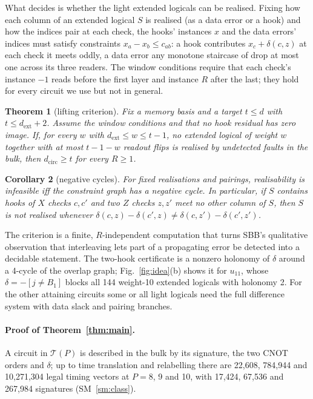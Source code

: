 \documentclass[aps,prl,twocolumn,superscriptaddress,nofootinbib]{revtex4-2}
\newcommand{\dcirc}{d_{\mathrm{circ}}}
\newcommand{\dext}{d_{\mathrm{ext}}}
\newcommand{\T}{\mathcal{T}}
\newtheorem{theorem}{Theorem}
\newtheorem{corollary}[theorem]{Corollary}
\begin{document}
What decides is whether the light extended logicals can be realised. Fixing how each
column of an extended logical $S$ is realised (as a data error or a hook) and how the
indices pair at each check, the hooks' instances $x$ and the data errors' indices must
satisfy constraints $x_a-x_b\le c_{ab}$: a hook contributes $x_c+\delta(c,z)$ at each check
it meets oddly, a data error any monotone staircase of drop at most one across its three
readers. The window conditions require that each check's instance $-1$ reads before the
first layer and instance $R$ after the last; they hold for every circuit we use but not
in general.

\begin{theorem}[lifting criterion]\label{thm:criterion}
Fix a memory basis and a target $t\le d$ with $t\le\dext+2$. Assume the window conditions
and that no hook residual has zero image. If, for every $w$ with $\dext\le w\le t-1$, no
extended logical of weight $w$ together with at most $t-1-w$ readout flips is realised by
undetected faults in the bulk, then $\dcirc\ge t$ for every $R\ge1$.
\end{theorem}
\begin{corollary}[negative cycles]\label{cor:cycle}
For fixed realisations and pairings, realisability is infeasible iff the constraint graph
has a negative cycle. In particular, if $S$ contains hooks of $X$ checks $c,c'$ and two $Z$
checks $z,z'$ meet no other column of $S$, then $S$ is not realised whenever
$\delta(c,z)-\delta(c',z)\neq\delta(c,z')-\delta(c',z')$.
\end{corollary}
\noindent The criterion is a finite, $R$-independent computation that turns
SBB's qualitative observation that interleaving lets part of a propagating error be
detected into a decidable statement. The two-hook certificate is a nonzero
holonomy of $\delta$ around a 4-cycle of the overlap graph; Fig.~\ref{fig:idea}(b) shows it
for $u_{11}$, whose $\delta=-[j\neq B_1]$ blocks all 144 weight-10 extended logicals with
holonomy 2. For the other attaining circuits some or all light logicals need the full
difference system with data slack and pairing branches.

\paragraph{Proof of Theorem~\ref{thm:main}.}
A circuit in $\T(P)$ is described in the bulk by its signature, the two CNOT orders and
$\delta$; up to time translation and relabelling there are 22,608, 784,944 and 10,271,304
legal timing vectors at $P=8$, 9 and 10, with 17,424, 67,536 and 267,984 signatures
(SM~\ref{sm:class}).
\end{document}
